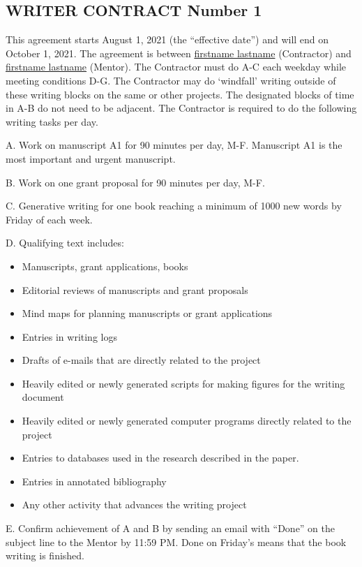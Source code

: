 \documentclass[9pt]{article}
\begin{document}
\thispagestyle{empty}
\subsection*{WRITER CONTRACT Number 1}
This agreement starts August 1, 2021 (the ``effective date'') and will end on October 1, 2021. 
The agreement is between \underline{firstname lastname}  (Contractor) and \underline{firstname lastname} (Mentor). 
The Contractor must do A-C each weekday while meeting conditions D-G.
The Contractor may do `windfall' writing outside of these writing blocks on the same or other projects. 
The designated blocks of time in A-B do not need to be adjacent.
The Contractor is required to do the following writing tasks per day.

A. Work on manuscript A1 for 90 minutes per day, M-F. 
Manuscript A1 is the most important and urgent manuscript.

B. Work on one grant proposal for 90 minutes per day, M-F. 

C. Generative writing for one book reaching a minimum of 1000 new words by Friday of each week.

D. Qualifying text includes: 

\begin{itemize}
\item Manuscripts, grant applications, books
\item Editorial reviews of manuscripts and grant proposals
\item Mind maps for planning manuscripts or grant applications
\item Entries in writing logs
\item Drafts of e-mails that are directly related to the project
\item Heavily edited or newly generated scripts for making figures for the writing document
\item Heavily edited or newly generated computer programs directly related to the project
\item Entries to databases used in the research described in the paper.
\item Entries in annotated bibliography
\item Any other activity that advances the writing project
\end{itemize}


E. Confirm achievement of A and B by sending an email with ``Done'' on the subject line to the Mentor by 11:59 PM. 
Done on Friday's means that the book writing is finished.
\end{document}
